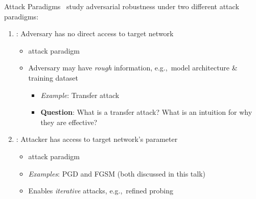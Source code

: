 \begin{frame}{Attack Paradigms}
  \madry\ study adversarial robustness under two different attack paradigms:
  \vfill
  \begin{enumerate}[<+->]
    \item {}: Adversary has no direct access to target network
      \begin{itemize}[<+->]
        \setlength\itemsep{6pt}
        \item {} attack paradigm
        \item Adversary may have \textit{rough} information, e.g.,~model architecture \& training dataset
          \begin{itemize}[<+->]
            \setlength{\itemsep}{6pt}
            \item \textit{Example}: Transfer attack
            \item \textbf{Question}: What is a transfer attack? What is an intuition for why they are effective?
          \end{itemize}
      \end{itemize}

    \vfill
    \item {}: Attacker has access to target network's parameter
      \begin{itemize}
        \setlength\itemsep{6pt}
        \item {} attack paradigm
        \item \textit{Examples}: PGD and FGSM (both discussed in this talk)
        \item Enables \textit{iterative} attacks, e.g.,~refined probing
      \end{itemize}
  \end{enumerate}
\end{frame}
